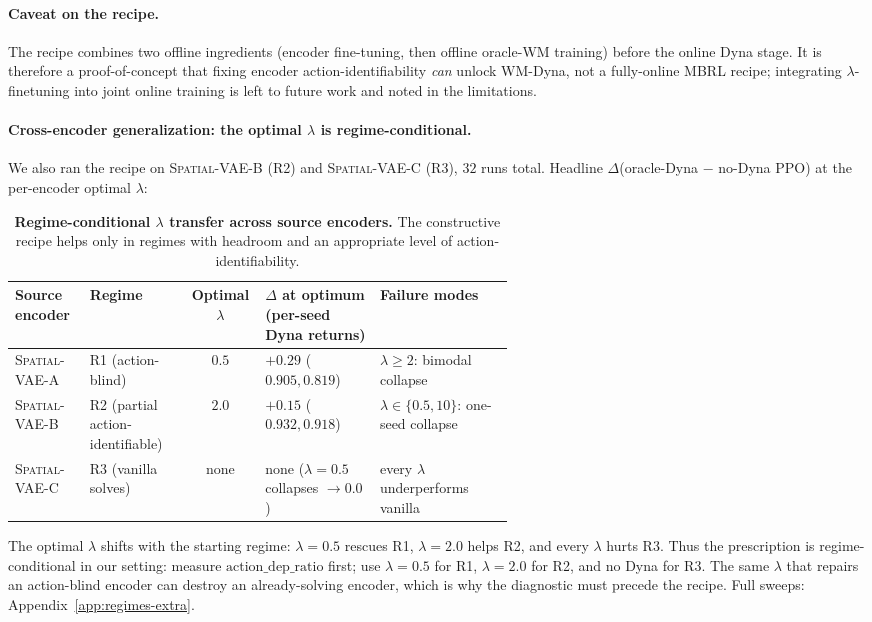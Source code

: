 \documentclass{article}
\newcommand{\srcVA}{\textsc{Spatial-VAE-A}}
\newcommand{\srcVB}{\textsc{Spatial-VAE-B}}
\newcommand{\srcVC}{\textsc{Spatial-VAE-C}}
\begin{document}
\paragraph{Caveat on the recipe.} The recipe combines two offline ingredients (encoder fine-tuning, then offline oracle-WM training) before the online Dyna stage. It is therefore a proof-of-concept that fixing encoder action-identifiability \emph{can} unlock WM-Dyna, not a fully-online MBRL recipe; integrating $\lambda$-finetuning into joint online training is left to future work and noted in the limitations.

\paragraph{Cross-encoder generalization: the optimal $\lambda$ is regime-conditional.} We also ran the recipe on \srcVB{} (R2) and \srcVC{} (R3), $32$ runs total. Headline $\Delta$(oracle-Dyna $-$ no-Dyna PPO) at the per-encoder optimal $\lambda$:
\begin{table}[t]
  \centering
  \footnotesize
  \caption{\textbf{Regime-conditional $\lambda$ transfer across source encoders.} The constructive recipe helps only in regimes with headroom and an appropriate level of action-identifiability.}
  \label{tab:lambda-regime-transfer}
  \setlength{\tabcolsep}{2pt}
  \renewcommand{\arraystretch}{1.05}
  \begin{tabularx}{\linewidth}{@{}L{0.15\linewidth}L{0.20\linewidth}cL{0.23\linewidth}X@{}}
    \toprule
    Source encoder & Regime & Optimal $\lambda$ & $\Delta$ at optimum (per-seed Dyna returns) & Failure modes \\
    \midrule
    \srcVA{} & R1 (action-blind) & $\mathbf{0.5}$ & $\mathbf{+0.29}$ ($0.905, 0.819$) & $\lambda\geq 2$: bimodal collapse \\
    \srcVB{} & R2 (partial action-identifiable) & $\mathbf{2.0}$ & $\mathbf{+0.15}$ ($0.932, 0.918$) & $\lambda{\in}\{0.5, 10\}$: one-seed collapse \\
    \srcVC{} & R3 (vanilla solves) & none & none ($\lambda{=}0.5$ collapses $\to 0.0$) & every $\lambda$ underperforms vanilla \\
    \bottomrule
  \end{tabularx}
\end{table}
The optimal $\lambda$ shifts with the starting regime: $\lambda{=}0.5$ rescues R1, $\lambda{=}2.0$ helps R2, and every $\lambda$ hurts R3. Thus the prescription is regime-conditional in our setting: measure $\mathrm{action\_dep\_ratio}$ first; use $\lambda{=}0.5$ for R1, $\lambda{=}2.0$ for R2, and no Dyna for R3. The same $\lambda$ that repairs an action-blind encoder can destroy an already-solving encoder, which is why the diagnostic must precede the recipe. Full sweeps: Appendix~\ref{app:regimes-extra}.
\end{document}
